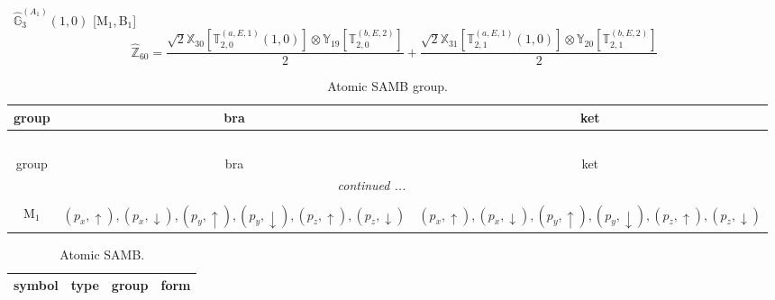 \documentclass[fleqn,10pt,landscape]{article}
\begin{document}
\begin{itemize}
\begin{dmath*}
\end{dmath*}
\vspace{4mm}
\noindent {} $\,\,\,\hat{\mathbb{G}}_{3}^{(A_{1})}(1,0)$ [M$_{1}$,\,B$_{1}$]
\begin{dmath*}
\hat{\mathbb{Z}}_{60}=\frac{\sqrt{2} \mathbb{X}_{30}[\mathbb{T}_{2,0}^{(a,E,1)}(1,0)] \otimes\mathbb{Y}_{19}[\mathbb{T}_{2,0}^{(b,E,2)}]}{2} + \frac{\sqrt{2} \mathbb{X}_{31}[\mathbb{T}_{2,1}^{(a,E,1)}(1,0)] \otimes\mathbb{Y}_{20}[\mathbb{T}_{2,1}^{(b,E,2)}]}{2}
\end{dmath*}
\begin{center}
\renewcommand{\arraystretch}{1.3}
\begin{longtable}{c|c|c}
\caption{Atomic SAMB group.}
 \\
 \hline \hline
group & bra & ket \\ \hline \endfirsthead

\multicolumn{2}{l}{\tablename\ \thetable{}} \\
 \hline \hline
group & bra & ket \\ \hline \endhead

 \hline \hline
\multicolumn{2}{r}{\footnotesize\it continued ...} \\ \endfoot

 \hline \hline
\multicolumn{2}{r}{} \\ \endlastfoot

M$_{1}$ & $(p_{x},\uparrow), (p_{x},\downarrow), (p_{y},\uparrow), (p_{y},\downarrow), (p_{z},\uparrow), (p_{z},\downarrow)$ & $(p_{x},\uparrow), (p_{x},\downarrow), (p_{y},\uparrow), (p_{y},\downarrow), (p_{z},\uparrow), (p_{z},\downarrow)$ \\
\end{longtable}
\end{center}
\begin{center}
\renewcommand{\arraystretch}{1.3}
\begin{longtable}{c|c|c|c}
\caption{Atomic SAMB.}
 \\
 \hline \hline
symbol & type & group & form \\ \hline \endfirsthead


\end{longtable}
\end{center}
\end{itemize}
\end{document}
